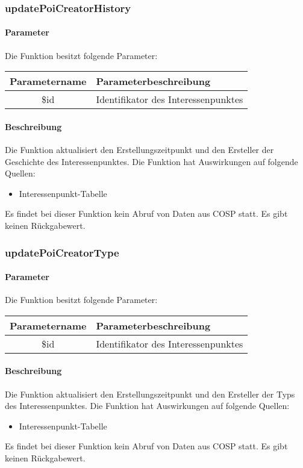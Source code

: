 \subsubsection{updatePoiCreatorHistory}
\paragraph{Parameter} Die Funktion besitzt folgende Parameter:
\begin{table}[H]
	\begin{tabular}{|c|p{11cm}|}
		\hline
		\textbf{Parametername} & \textbf{Parameterbeschreibung} \\ \hline
		\$id & Identifikator des Interessenpunktes \\ \hline
	\end{tabular}
\end{table}
\paragraph{Beschreibung} Die Funktion aktualisiert den Erstellungszeitpunkt und den Ersteller der Geschichte des Interessenpunktes. Die Funktion hat Auswirkungen auf folgende Quellen:
\begin{itemize}
	\item Interessenpunkt-Tabelle
\end{itemize}
Es findet bei dieser Funktion kein Abruf von Daten aus {\glqq COSP\grqq} statt. Es gibt keinen Rückgabewert.
\subsubsection{updatePoiCreatorType}
\paragraph{Parameter} Die Funktion besitzt folgende Parameter:
\begin{table}[H]
	\begin{tabular}{|c|p{11cm}|}
		\hline
		\textbf{Parametername} & \textbf{Parameterbeschreibung} \\ \hline
		\$id & Identifikator des Interessenpunktes \\ \hline
	\end{tabular}
\end{table}
\paragraph{Beschreibung} Die Funktion aktualisiert den Erstellungszeitpunkt und den Ersteller der Typs des Interessenpunktes. Die Funktion hat Auswirkungen auf folgende Quellen:
\begin{itemize}
	\item Interessenpunkt-Tabelle
\end{itemize}
Es findet bei dieser Funktion kein Abruf von Daten aus {\glqq COSP\grqq} statt. Es gibt keinen Rückgabewert.
